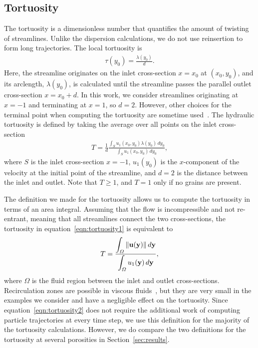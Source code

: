 \documentclass{jfm}
\begin{document}
\subsection{Tortuosity}
The tortuosity is a dimensionless number that quantifies the amount of
twisting of streamlines. Unlike the dispersion calculations, we do not
use reinsertion to form long trajectories.  The local tortuosity is
\begin{align}
  \tau(y_0) = \frac{\lambda(y_0)}{d}.
  \label{eqn:localTort}
\end{align}
Here, the streamline originates on the inlet cross-section $x=x_0$ at
$(x_0,y_0)$, and its arclength, $\lambda(y_0)$, is calculated until the
streamline passes the parallel outlet cross-section $x = x_0 + d$.  In
this work, we consider streamlines originating at $x=-1$ and terminating
at $x=1$, so $d=2$.  However, other choices for the terminal point when
computing the tortuosity are sometime used~\citep{dud-koz-mat2011}.  The
hydraulic tortuosity is defined by taking the average over all points on
the inlet cross-section
\begin{align}
  T = \frac{1}{d}\frac{\displaystyle\int_{S}u_1(x_0,y_0)\lambda(y_0)\,dy_0}
  {\displaystyle\int_{S}u_1(x_0,y_0)\,dy_0},
  \label{eqn:tortuosity1}
\end{align} 
where $S$ is the inlet cross-section $x = -1$, $u_1(y_0)$ is the
$x$-component of the velocity at the initial point of the streamline,
and $d=2$ is the distance between the inlet and outlet.  Note that $T
\geq 1$, and $T=1$ only if no grains are present.

The definition we made for the tortuosity allows us to compute the
tortuosity in terms of an area integral.  Assuming that the flow is
incompressible and not re-entrant, meaning that all streamlines connect
the two cross-sections, the tortuosity in
equation~\eqref{eqn:tortuosity1} is equivalent to~\citep{dud-koz-mat2011}
\begin{align}
  T = \frac{\displaystyle\int_\varOmega \|{\mathbf{u}}({\mathbf{y}})\|\, d{\mathbf{y}}}
           {\displaystyle\int_\varOmega u_1({\mathbf{y}})\, d{\mathbf{y}}},
  \label{eqn:tortuosity2}
\end{align}
where $\Omega$ is the fluid region between the inlet and outlet
cross-sections.  Recirculation zones are possible in viscous
fluids~\citep{hig1985}, but they are very small in the examples we
consider and have a negligible effect on the tortuosity.  Since
equation~\eqref{eqn:tortuosity2} does not require the additional work of
computing particle trajectories at every time step, we use this
definition for the majority of the tortuosity calculations.  However, we
do compare the two definitions for the tortuosity at several porosities
in Section~\ref{sec:results}.
\end{document}
